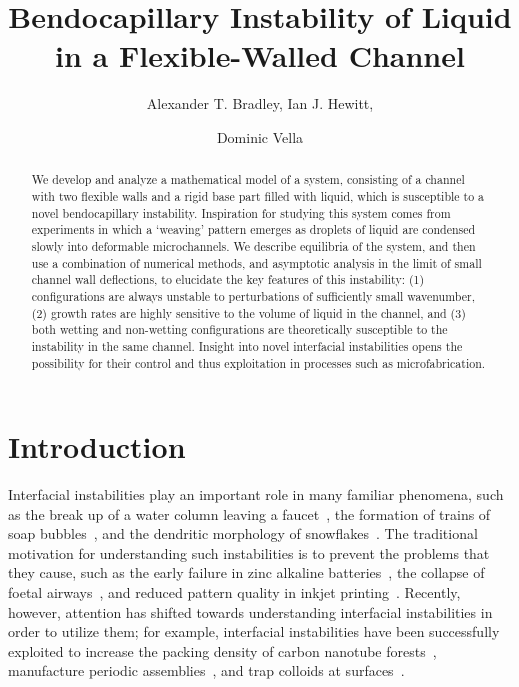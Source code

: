 \documentclass{jfm}
\title{Bendocapillary Instability of Liquid in a Flexible-Walled Channel}
\author{Alexander T. Bradley\aff{1},
  Ian J. Hewitt\aff{1},
 \and Dominic Vella\aff{1} \corresp{\email{vella@maths.ox.ac.uk}}}
\affiliation{\aff{1} Mathematical Institute, University of Oxford, Woodstock Rd, Oxford, OX2 6GG, United Kingdom}
\begin{document}
\maketitle

\begin{abstract}
We develop and analyze a mathematical model of a system, consisting of a channel with two flexible walls and a rigid base part filled with liquid, which is susceptible to a novel bendocapillary instability. Inspiration for studying this system comes from experiments in which a `weaving' pattern emerges as droplets of liquid are condensed slowly into deformable microchannels. We describe equilibria of the system, and then use a combination of numerical methods, and asymptotic analysis in the limit of small channel wall deflections, to elucidate the key features of this instability: (1) configurations are always unstable to perturbations of sufficiently small wavenumber, (2) growth rates are highly sensitive to the volume of liquid in the channel, and (3) both wetting and non-wetting configurations are theoretically susceptible to the instability in the same channel. Insight into novel interfacial instabilities opens the possibility for their control and thus exploitation in processes such as microfabrication.
\end{abstract}


\graphicspath{{./figures/}}

\section{Introduction}\label{S:Introduction}
Interfacial instabilities play an important role in many familiar phenomena, such as the break up of a water column leaving a faucet~\citep{Plateau1873, Rayleigh1879PRSL}, the formation of trains of soap bubbles~\citep{Eggers2008RepProgPhys}, and the dendritic morphology of snowflakes~\citep{Langer1980RevModPhys}. The traditional motivation for understanding such instabilities is to prevent the problems that they cause, such as the early failure in zinc alkaline batteries~\citep{Gallaway2010Electrochem}, the collapse of foetal airways~\citep{Halpern1992JFM}, and reduced pattern quality in inkjet printing~\citep{Calvert2007Science}. Recently, however, attention has shifted towards understanding interfacial instabilities in order to utilize them; for example, interfacial instabilities have been successfully exploited to increase the packing density of carbon nanotube forests~\citep{Chakrapani2004PNAS}, manufacture periodic assemblies~\cite[e.g.][]{DeVolder2013Angewandte}, and trap colloids at surfaces~\citep{Pokroy2009Science}.
\end{document}
